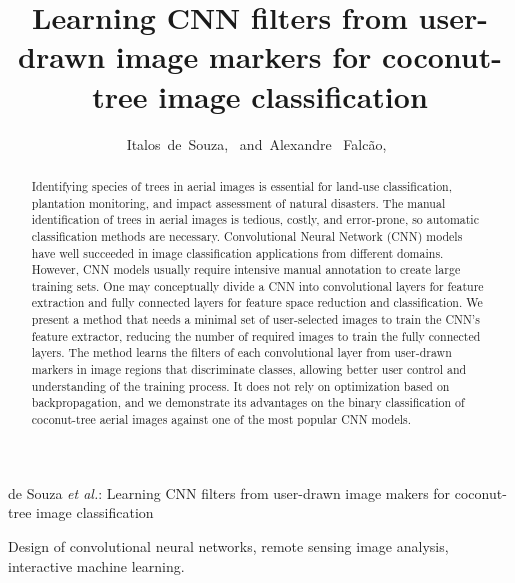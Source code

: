 \documentclass[journal, twoside]{IEEEtran}
\begin{document}
\title{Learning CNN filters from user-drawn image markers for coconut-tree image classification}

\author{Italos~de~Souza,~
        and~Alexandre~ Falc\~{a}o,~}
        
%
{de Souza \MakeLowercase{\textit{et al.}}: Learning CNN filters from user-drawn image makers for coconut-tree image classification}

\maketitle

\begin{abstract}
Identifying species of trees in aerial images is essential for land-use classification, plantation monitoring, and impact assessment of natural disasters. The manual identification of trees in aerial images is tedious, costly, and error-prone, so automatic classification methods are necessary. Convolutional Neural Network (CNN) models have well succeeded in image classification applications from different domains. However, CNN models usually require intensive manual annotation to create large training sets. One may conceptually divide a CNN into convolutional layers for feature extraction and fully connected layers for feature space reduction and classification. We present a method that needs a minimal set of user-selected images to train the CNN's feature extractor, reducing the number of required images to train the fully connected layers. The method learns the filters of each convolutional layer from user-drawn markers in image regions that discriminate classes, allowing better user control and understanding of the training process. It does not rely on optimization based on backpropagation, and we demonstrate its advantages on the binary classification of coconut-tree aerial images against one of the most popular CNN models.
\end{abstract}

\begin{IEEEkeywords}
Design of convolutional neural networks, remote sensing image analysis, interactive machine learning.
\end{IEEEkeywords}
\end{document}
